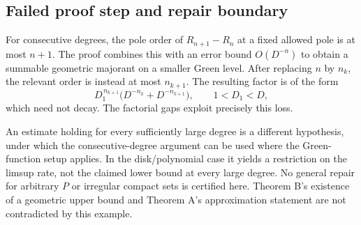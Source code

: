 \documentclass[10pt]{article}
\begin{document}
\subsection*{Failed proof step and repair boundary}
For consecutive degrees, the pole order of \(R_{n+1}-R_n\) at a fixed allowed pole is at most \(n+1\). The proof combines this with an error bound \(O(D^{-n})\) to obtain a summable geometric majorant on a smaller Green level. After replacing \(n\) by \(n_k\), the relevant order is instead at most \(n_{k+1}\). The resulting factor is of the form \[D_1^{\,n_{k+1}}\bigl(D^{-n_k}+D^{-n_{k+1}}\bigr),
 \qquad 1<D_1<D,\] which need not decay. The factorial gaps exploit precisely this loss.\par
An estimate holding for every sufficiently large degree is a different hypothesis, under which the consecutive-degree argument can be used where the Green-function setup applies. In the disk/polynomial case it yields a restriction on the limsup rate, not the claimed lower bound at every large degree. No general repair for arbitrary \(P\) or irregular compact sets is certified here. Theorem B’s existence of a geometric upper bound and Theorem A’s approximation statement are not contradicted by this example.\par
\end{document}
